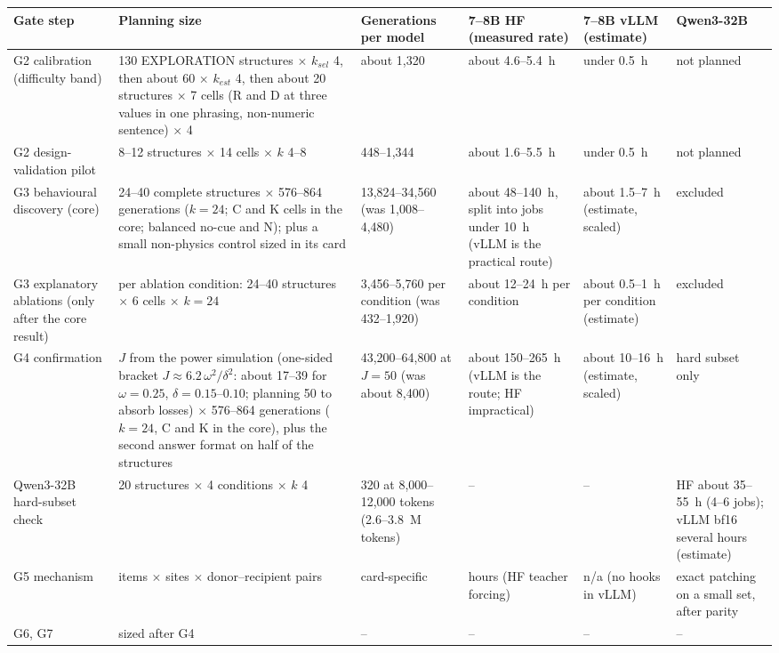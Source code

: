 \documentclass[10pt,a4paper]{article}
\begin{document}
\begin{center}\footnotesize
\begin{tabularx}{\linewidth}{@{}P{2.6cm}P{3.9cm}P{1.9cm}P{2.3cm}P{1.6cm}L@{}}
\toprule
Gate step & Planning size & Generations per model & 7--8B HF (measured rate) & 7--8B vLLM (estimate) & Qwen3-32B \\
\midrule
G2 calibration (difficulty band) & 130 EXPLORATION structures $\times$ $k_{sel}$ 4, then about 60 $\times$ $k_{est}$ 4, then about 20
structures $\times$ 7 cells (R and D at three values in one phrasing, non-numeric sentence) $\times$ 4 & about 1{,}320 & about 4.6--5.4~h & under 0.5~h & not planned \\
G2 design-validation pilot & 8--12 structures $\times$ 14 cells $\times$ $k$ 4--8 & 448--1{,}344 &
about 1.6--5.5~h & under 0.5~h & not planned \\
G3 behavioural discovery (core) & 24--40 complete structures $\times$ 576--864 generations ($k=24$; C and K cells in the core; balanced no-cue and N); plus a small
non-physics control sized in its card & 13{,}824--34{,}560 (was 1{,}008--4{,}480) & about 48--140~h, split into jobs under 10~h (vLLM is the practical route) & about
1.5--7~h (estimate, scaled) & excluded \\
G3 explanatory ablations (only after the core result) & per ablation condition: 24--40 structures $\times$ 6 cells
$\times$ $k=24$ & 3{,}456--5{,}760 per condition (was 432--1{,}920) & about 12--24~h per condition & about 0.5--1~h per condition (estimate) &
excluded \\
G4 confirmation & $J$ from the power simulation (one-sided bracket $J\approx6.2\,\omega^2/\delta^2$: about 17--39
for $\omega=0.25$, $\delta=0.15$--$0.10$; planning 50 to absorb losses) $\times$ 576--864 generations ($k=24$, C and K in the core), plus the
second answer format on half of the structures & 43{,}200--64{,}800 at $J=50$ (was about 8{,}400) & about 150--265~h (vLLM is the route; HF impractical) & about 10--16~h (estimate, scaled) & hard
subset only \\
Qwen3-32B hard-subset check & 20 structures $\times$ 4 conditions $\times$ $k$ 4 & 320 at 8{,}000--12{,}000 tokens
(2.6--3.8~M tokens) & -- & -- & HF about 35--55~h (4--6 jobs); vLLM bf16 several hours (estimate) \\
G5 mechanism & items $\times$ sites $\times$ donor--recipient pairs & card-specific & hours (HF teacher forcing) &
n/a (no hooks in vLLM) & exact patching on a small set, after parity \\
G6, G7 & sized after G4 & -- & -- & -- & -- \\
\bottomrule
\end{tabularx}
\end{center}
\end{document}
